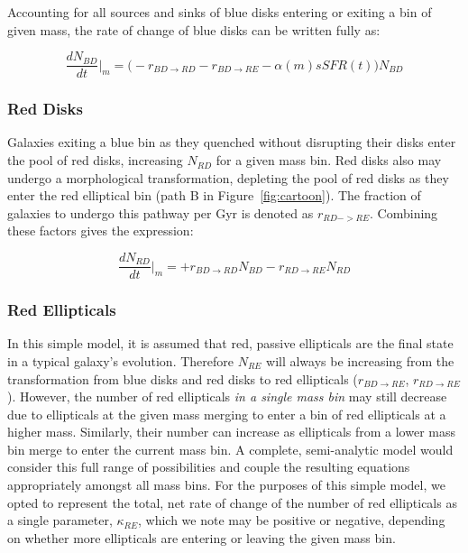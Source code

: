 Accounting for all sources and sinks of blue disks entering or exiting a bin of given mass, the rate of change of blue disks can be written fully as:

\begin{equation}
\frac{dN_{BD}}{dt}\Big\rvert_{m} = \Big(-r_{BD \rightarrow RD} - r_{BD\rightarrow RE} -\alpha(m) sSFR(t) \Big)N_{BD}
\label{eqn:BD}
\end{equation}

\subsubsection{Red Disks}
Galaxies exiting a blue bin as they quenched without disrupting their disks enter the pool of red disks, increasing $N_{RD}$ for a given mass bin. Red disks also may undergo a morphological transformation, depleting the pool of red disks as they enter the red elliptical bin (path B in Figure~\ref{fig:cartoon}). The fraction of galaxies to undergo this pathway per Gyr is denoted as $r_{RD->RE}$. Combining these factors gives the expression: 

\begin{equation}
\frac{dN_{RD}}{dt}\Big\rvert_{m} = + r_{BD \rightarrow RD}N_{BD} - r_{RD \rightarrow RE}N_{RD}
\label{eqn:RD}
\end{equation}

\subsubsection{Red Ellipticals}
In this simple model, it is assumed that red, passive ellipticals are the final state in a typical galaxy's evolution. Therefore $N_{RE}$ will always be increasing from the transformation from blue disks and red disks to red ellipticals ($r_{BD \rightarrow RE}$, $r_{RD \rightarrow RE}$). However, the number of red ellipticals \emph{in a single mass bin} may still decrease due to ellipticals at the given mass merging to enter a bin of red ellipticals at a higher mass. Similarly, their number can increase as ellipticals from a lower mass bin merge to enter the current mass bin. A complete, semi-analytic model would consider this full range of possibilities and couple the resulting equations appropriately amongst all mass bins. For the purposes of this simple model, we opted to represent the total, net rate of change of the number of red ellipticals as a single parameter, $\kappa_{RE}$, which we note may be positive or negative, depending on whether more ellipticals are entering or leaving the given mass bin. 

